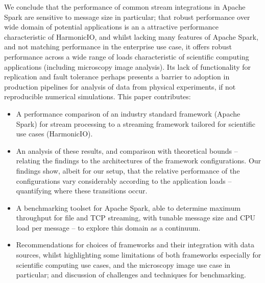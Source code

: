 \documentclass[conference]{IEEEtran}
\begin{document}

We conclude that the performance of common stream integrations in Apache Spark are sensitive to message size in particular; that
robust performance over wide domain of potential applications is an a attractive performance characteristic of HarmonicIO, and whilst lacking many features of Apache Spark, and not matching performance in the enterprise use case, it offers robust performance across a wide range of loads characteristic of scientific computing applications (including microscopy image analysis).
Its lack of functionality for replication and fault tolerance perhaps presents a barrier to adoption in production pipelines for analysis of data from physical experiments, if not reproducible numerical simulations.
This paper contributes:

\begin{itemize}
\item A performance comparison of an industry standard framework (Apache Spark) for stream processing to a streaming framework tailored for scientific use cases (HarmonicIO).

\item An analysis of these results, and comparison with theoretical bounds -- relating the findings to the architectures of the framework configurations. Our findings show, albeit for our setup, that the relative performance of the configurations vary considerably according to the application loads -- quantifying where these transitions occur.

\item A benchmarking toolset for Apache Spark, able to determine maximum throughput for file and TCP streaming, with tunable message size and CPU load per message -- to explore this domain as a continuum.

\item Recommendations for choices of frameworks and their integration with data sources, whilst highlighting some 
 limitations of both frameworks especially for scientific computing use cases, and the microscopy image use case in particular; and discussion of challenges and techniques for benchmarking.
 
\end{itemize}
\end{document}
